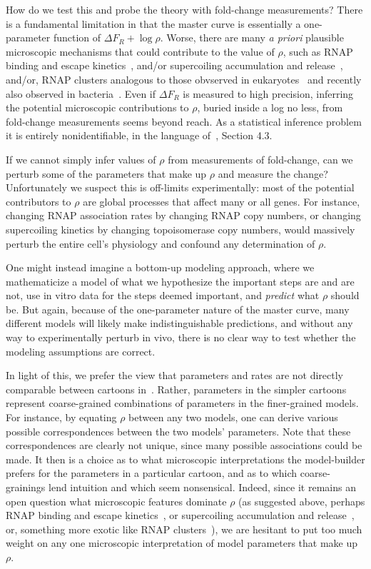 How do we test this and probe the theory with fold-change measurements? There is
a fundamental limitation in that the master curve is essentially a one-parameter
function of $\Delta F_R + \log\rho$. Worse, there are many \textit{a priori}
plausible microscopic mechanisms that could contribute to the value of $\rho$,
such as RNAP binding and escape kinetics~\cite{DeHaseth1998, Mitarai2015},
and/or supercoiling accumulation and release~\cite{Chong2014, Sevier2016},
and/or, RNAP clusters analogous to those obvserved in
eukaryotes~\cite{Cisse2013, Cho2016} and recently also observed in
bacteria~\cite{Ladouceur2020}. Even if $\Delta F_R$ is measured to high
precision, inferring the potential microscopic contributions to $\rho$, buried
inside a log no less, from fold-change measurements seems beyond reach. As a
statistical inference problem it is entirely nonidentifiable, in the language
of~\cite{Gelman2013}, Section 4.3.

If we cannot simply infer values of $\rho$ from measurements of fold-change, can
we perturb some of the parameters that make up $\rho$ and measure the change?
Unfortunately we suspect this is off-limits experimentally: most of the
potential contributors to $\rho$ are global processes that affect many or all
genes. For instance, changing RNAP association rates by changing RNAP copy
numbers, or changing supercoiling kinetics by changing topoisomerase copy
numbers, would massively perturb the entire cell's physiology and confound any
determination of $\rho$.

One might instead imagine a bottom-up modeling approach, where we mathematicize
a model of what we hypothesize the important steps are and are not, use in vitro
data for the steps deemed important, and \textit{predict} what $\rho$ should be.
But again, because of the one-parameter nature of the master curve, many
different models will likely make indistinguishable predictions, and without any
way to experimentally perturb in vivo, there is no clear way to test whether the
modeling assumptions are correct.

In light of this, we prefer the view that parameters and rates are not directly
comparable between cartoons in~. Rather, parameters in
the simpler cartoons represent coarse-grained combinations of parameters in the
finer-grained models. For instance, by equating $\rho$ between any two models,
one can derive various possible correspondences between the two models'
parameters. Note that these correspondences are clearly not unique, since many
possible associations could be made. It then is a choice as to what microscopic
interpretations the model-builder prefers for the parameters in a particular
cartoon, and as to which coarse-grainings lend intuition and which seem
nonsensical. Indeed, since it remains an open question what microscopic features
dominate $\rho$ (as suggested above, perhaps RNAP binding and escape
kinetics~\cite{DeHaseth1998, Mitarai2015}, or supercoiling accumulation and
release~\cite{Chong2014, Sevier2016}, or, something more exotic like RNAP
clusters~\cite{Cisse2013, Cho2016, Ladouceur2020}), we are hesitant to put too
much weight on any one microscopic interpretation of model parameters that make
up $\rho$.

